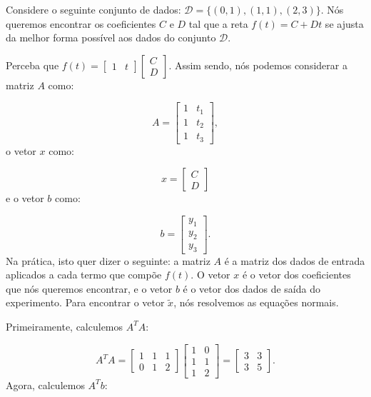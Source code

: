 \begin{Example}
	Considere o seguinte conjunto de dados: $\mathcal{D} = \{(0, 1), (1, 1), (2, 3)\}$. Nós queremos encontrar os coeficientes $C$ e $D$ tal que a reta $f(t) = C + Dt$ se ajusta da melhor forma possível aos dados do conjunto $\mathcal{D}$.
	
	Perceba que $f(t) = \begin{bmatrix}
		1 & t
	\end{bmatrix}\begin{bmatrix}
		C \\
		D
	\end{bmatrix}$. Assim sendo, nós podemos considerar a matriz $A$ como:
	
	$$
	A = \begin{bmatrix}
		1 & t_1 \\
		1 & t_2 \\
		1 & t_3
	\end{bmatrix},
	$$
	o vetor $x$ como:
	
	$$
	x = \begin{bmatrix}
		C \\
		D
	\end{bmatrix}
	$$
	e o vetor $b$ como:
	
	$$
	b = \begin{bmatrix}
		y_1 \\
		y_2 \\
		y_3
	\end{bmatrix}.
	$$
	Na prática, isto quer dizer o seguinte: a matriz $A$ é a matriz dos dados de entrada aplicados a cada termo que compõe $f(t)$. O vetor $x$ é o vetor dos coeficientes que nós queremos encontrar, e o vetor $b$ é o vetor dos dados de saída do experimento. Para encontrar o vetor $\tilde{x}$, nós resolvemos as equações normais.
	
	Primeiramente, calculemos $A^TA$:
	
	$$
	A^TA = \begin{bmatrix}
		1 & 1 & 1 \\
		0 & 1 & 2
	\end{bmatrix}\begin{bmatrix}
		1 & 0 \\
		1 & 1 \\
		1 & 2
	\end{bmatrix} = \begin{bmatrix}
		3 & 3 \\
		3 & 5
	\end{bmatrix}.
	$$
	Agora, calculemos $A^Tb$:
	

\end{Example}
